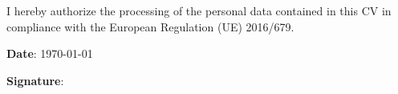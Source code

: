 \begin{cvparagraph}
    \begin{center}
        I hereby authorize the processing of the personal data contained in this CV in compliance with the European Regulation (UE) 2016/679.
    \end{center}
    
\end{cvparagraph}
\begin{cvparagraph}
\begin{minipage}{0.5\textwidth}
\textbf{Date}: \today
\end{minipage} 
\begin{minipage}{0.5\textwidth}
\textbf{Signature}:
\end{minipage}
\end{cvparagraph}